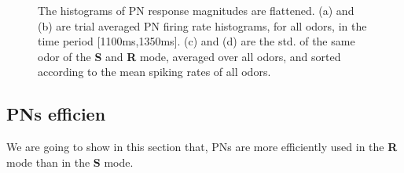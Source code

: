 \documentclass[12pt, a4paper]{article}
\begin{document}
\begin{figure}[htbp]\centering
    \hspace{0.5cm}

    \hspace{0.5cm}
\caption[Hist~Flatten]{\label{Figure2:histflatten} \small The histograms of PN response magnitudes are flattened. (a) and (b) are trial averaged PN firing rate histograms, for all odors, in the time period [1100ms,1350ms]. (c) and (d) are the std. of the same odor of the {\bf S} and {\bf R} mode, averaged over all odors, and sorted according to the mean spiking rates of all odors.}
\end{figure}

\subsection{PNs efficien} \label{Sect:PNefficience}
We are going to show in this section that, PNs are more efficiently used in the {\bf R} mode than in the {\bf S} mode.
\end{document}
